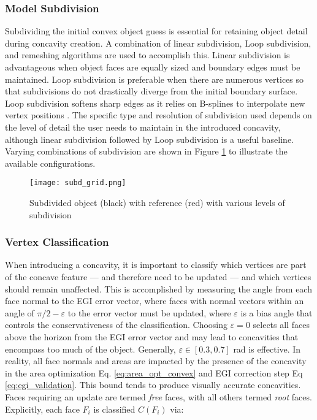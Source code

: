 \subsubsection{Model Subdivision}

Subdividing the initial convex object guess is essential for retaining object detail during concavity creation. A combination of linear subdivision, Loop subdivision, and remeshing algorithms are used to accomplish this. Linear subdivision is advantageous when object faces are equally sized and boundary edges must be maintained. Loop subdivision is preferable when there are numerous vertices so that subdivisions do not drastically diverge from the initial boundary surface. Loop subdivision softens sharp edges as it relies on B-splines to interpolate new vertex positions \cite{loop1987}. The specific type and resolution of subdivision used depends on the level of detail the user needs to maintain in the introduced concavity, although linear subdivision followed by Loop subdivision is a useful baseline. Varying combinations of subdivision are shown in Figure \ref{fig:subd_grid} to illustrate the available configurations.

\graphicspath{{/Users/liamrobinson/Documents/msthesis/static_images/aas_2022_figs}}
\begin{figure}[!htb]
  \centering
  \texttt{[image: subd\_grid.png]}
  \caption{Subdivided object (black) with reference (red) with various levels of subdivision}
  \label{fig:subd_grid}
\end{figure}

\subsubsection{Vertex Classification}

When introducing a concavity, it is important to classify which vertices are part of the concave feature --- and therefore need to be updated --- and which vertices should remain unaffected. This is accomplished by measuring the angle from each face normal to the EGI error vector, where faces with normal vectors within an angle of $\pi/2 - \varepsilon$ to the error vector must be updated, where $\varepsilon$ is a bias angle that controls the conservativeness of the classification. Choosing $\varepsilon=0$ selects all faces above the horizon from the EGI error vector and may lead to concavities that encompass too much of the object. Generally, $\varepsilon \in [0.3, 0.7]$ rad is effective. In reality, all face normals and areas are impacted by the presence of the concavity in the area optimization Eq. \ref{eq:area_opt_convex} and EGI correction step Eq \ref{eq:egi_validation}. This bound tends to produce visually accurate concavities. Faces requiring an update are termed \textit{free} faces, with all others termed \textit{root} faces. Explicitly, each face $F_i$ is classified $C(F_i)$ via:

